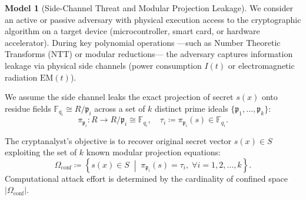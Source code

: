 \documentclass[11pt,a4paper]{article}
\theoremstyle{plain}
\theoremstyle{definition}
\newtheorem{modelo}[teorema]{Model}
\numberwithin{equation}{section}
\newcommand{\FF}{\mathbb{F}}
\newcommand{\fkp}{\mathfrak{p}}
\begin{document}
\begin{modelo}[Side-Channel Threat and Modular Projection Leakage]
\label{mod:threat_model}
We consider an active or passive adversary with physical execution access to the cryptographic algorithm on a target device (microcontroller, smart card, or hardware accelerator). During key polynomial operations —such as Number Theoretic Transforms (NTT) or modular reductions— the adversary captures information leakage via physical side channels (power consumption $I(t)$ or electromagnetic radiation $\mathrm{EM}(t)$).

We assume the side channel leaks the exact projection of secret $s(x)$ onto residue fields $\FF_{q_i} \cong R/\fkp_i$ across a set of $k$ distinct prime ideals $\{\fkp_1, \dots, \fkp_k\}$:
\begin{equation}
\pi_{\fkp_i}: R \longrightarrow R/\fkp_i \cong \FF_{q_i}, \quad \tau_i \coloneqq \pi_{\fkp_i}(s) \in \FF_{q_i}.
\end{equation}

The cryptanalyst's objective is to recover original secret vector $s(x) \in S$ exploiting the set of $k$ known modular projection equations:
\begin{equation}
\Omega_{\mathrm{conf}} \coloneqq \left\{ s(x) \in S \;\middle|\; \pi_{\fkp_i}(s) = \tau_i, \; \forall i = 1, 2, \dots, k \right\}.
\end{equation}
Computational attack effort is determined by the cardinality of confined space $|\Omega_{\mathrm{conf}}|$.
\end{modelo}
\end{document}
